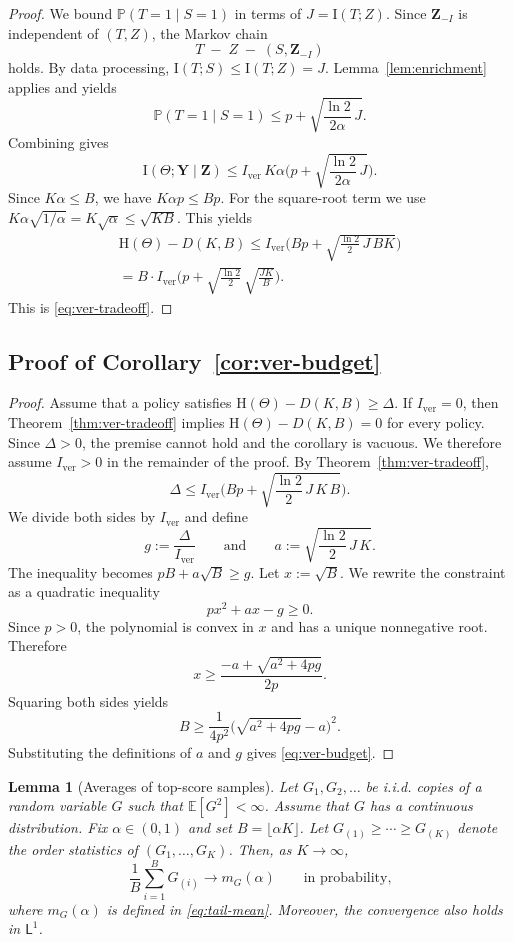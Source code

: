\documentclass[twocolumn]{scholar7}
\newtheorem{lemma}[theorem]{Lemma}
\newcommand{\E}{\mathbb{E}}
\newcommand{\Prob}{\mathbb{P}}
\newcommand{\I}{\mathrm{I}}
\newcommand{\Hh}{\mathrm{H}}
\begin{document}
\begin{appendix}
\begin{proof}
We bound $\Prob(T=1\mid S=1)$ in terms of $J=\I(T;Z)$.
Since $\bm{Z}_{-I}$ is independent of $(T,Z)$, the Markov chain
\[
T\; -\; Z\; -\; (S,\bm{Z}_{-I})
\]
holds.
By data processing, $\I(T;S)\le \I(T;Z)=J$.
Lemma~\ref{lem:enrichment} applies and yields
\[
\Prob(T=1\mid S=1)
\le
p + \sqrt{\frac{\ln 2}{2\alpha}\,J}.
\]
Combining gives
\[
\I(\Theta;\bm{Y}\mid \bm{Z})
\le
I_{\mathrm{ver}}\,K\alpha\Bigg(p + \sqrt{\frac{\ln 2}{2\alpha}\,J}\Bigg).
\]
Since $K\alpha\le B$, we have $K\alpha p\le Bp$.
For the square-root term we use $K\alpha\sqrt{1/\alpha}=K\sqrt{\alpha}\le \sqrt{KB}$.
This yields
\begin{multline*}
\Hh(\Theta)-D(K,B)
\le
I_{\mathrm{ver}}\Bigg(Bp + \sqrt{\frac{\ln 2}{2}\,J\,BK}\Bigg) \\
=
B\cdot I_{\mathrm{ver}}\Bigg(
p + \sqrt{\frac{\ln 2}{2}}\,\sqrt{\frac{JK}{B}}
\Bigg).
\end{multline*}
This is \eqref{eq:ver-tradeoff}.
\end{proof}

\subsection{Proof of Corollary~\ref{cor:ver-budget}}
\begin{proof}
Assume that a policy satisfies $\Hh(\Theta)-D(K,B)\ge \Delta$.
If $I_{\mathrm{ver}}=0$, then Theorem~\ref{thm:ver-tradeoff} implies $\Hh(\Theta)-D(K,B)=0$ for every policy.
Since $\Delta>0$, the premise cannot hold and the corollary is vacuous.
We therefore assume $I_{\mathrm{ver}}>0$ in the remainder of the proof.
By Theorem~\ref{thm:ver-tradeoff},
\[
\Delta
\le
I_{\mathrm{ver}}\Bigg(Bp + \sqrt{\frac{\ln 2}{2}\,J\,K\,B}\Bigg).
\]
We divide both sides by $I_{\mathrm{ver}}$ and define
\[
g:=\frac{\Delta}{I_{\mathrm{ver}}}
\qquad\text{and}\qquad
a:=\sqrt{\frac{\ln 2}{2}\,J\,K}.
\]
The inequality becomes $pB+a\sqrt{B}\ge g$.
Let $x:=\sqrt{B}$.
We rewrite the constraint as a quadratic inequality
\[
p x^2 + a x - g \ge 0.
\]
Since $p>0$, the polynomial is convex in $x$ and has a unique nonnegative root.
Therefore
\[
x \ge \frac{-a+\sqrt{a^2+4pg}}{2p}.
\]
Squaring both sides yields
\[
B \ge \frac{1}{4p^2}\big(\sqrt{a^2+4pg}-a\big)^2.
\]
Substituting the definitions of $a$ and $g$ gives \eqref{eq:ver-budget}.
\end{proof}

\begin{lemma}[Averages of top-score samples]
\label{lem:top-alpha}
Let $G_1,G_2,\dots$ be i.i.d. copies of a random variable $G$ such that $\E[G^2]<\infty$.
Assume that $G$ has a continuous distribution.
Fix $\alpha\in(0,1)$ and set $B=\lfloor \alpha K\rfloor$.
Let $G_{(1)}\ge\cdots\ge G_{(K)}$ denote the order statistics of $(G_1,\dots,G_K)$.
Then, as $K\to\infty$,
\[
\frac{1}{B}\sum_{i=1}^B G_{(i)} \to m_G(\alpha)
\qquad\text{in probability,}
\]
where $m_G(\alpha)$ is defined in \eqref{eq:tail-mean}.
Moreover, the convergence also holds in $\mathsf{L}^1$.
\end{lemma}


\end{appendix}
\end{document}
